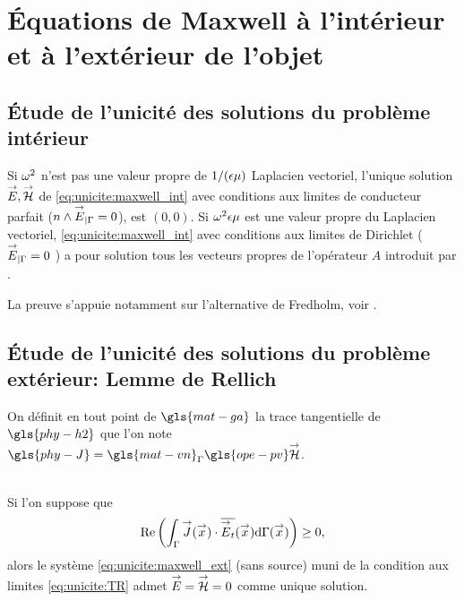 \section{Équations de Maxwell à l'intérieur et à l'extérieur de l'objet}

  \subsection{Étude de l'unicité des solutions du problème intérieur}

    \begin{thm}
      Si \(\omega^2\) n'est pas une valeur propre de \(1/(\epsilon\mu)\) Laplacien vectoriel, l'unique solution \({\overset{\rightarrow}{E}},{\overset{\rightarrow}{\mathcal{H}}}\) de \eqref{eq:unicite:maxwell_int} avec conditions aux limites de conducteur parfait (\(n\wedge {\overset{\rightarrow}{E}}_{|\Gamma} = 0\)), est \((0,0)\).
      Si \(\omega^2\epsilon\mu\) est une valeur propre du Laplacien vectoriel, \eqref{eq:unicite:maxwell_int} avec conditions aux limites de Dirichlet ( \({\overset{\rightarrow}{E}}_{|\Gamma} = 0\) ) a pour solution tous les vecteurs propres de l'opérateur \(A\) introduit par \cite[eq.~(133), p.~58]{cessenat_mathematical_1996}.
    \end{thm}
    La preuve s'appuie notamment sur l'alternative de Fredholm, voir \cite[Théorème~8, p.~111]{cessenat_mathematical_1996}.

  \subsection{Étude de l'unicité des solutions du problème extérieur: Lemme de Rellich}

    On définit en tout point de \(\gls{mat-ga}\) la trace tangentielle de \(\gls{phy-h2}\) que l'on note \(\gls{phy-J} = \gls{mat-vn}_\Gamma \gls{ope-pv} \vH\).

    \begin{prop}~\\
      Si l'on suppose que
      \begin{equation}
        \label{prop:cgu}
        \operatorname{Re}\left(\int_\Gamma {\overset{\rightarrow}{J}}({\overset{\rightarrow}{x}}) \cdot {\overline{{\overset{\rightarrow}{E}}_t}}({\overset{\rightarrow}{x}}) \mathrm{d}{\Gamma({\overset{\rightarrow}{x}})}\right) \ge 0,
      \end{equation}
      alors le système \eqref{eq:unicite:maxwell_ext} (sans source) muni de la condition aux limites \eqref{eq:unicite:TR} admet \({\overset{\rightarrow}{E}}={\overset{\rightarrow}{\mathcal{H}}}=0\) comme unique solution.
    \end{prop}
    
